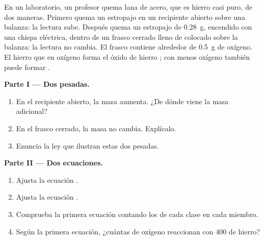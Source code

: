\begin{problem}
\label{pb:g8:balanced-equations:1}
En un laboratorio, un profesor quema lana de acero, que es hierro casi
puro, de dos maneras. Primero quema un estropajo en un recipiente
abierto sobre una balanza: la lectura sube. Después quema un estropajo
de \qty{0.28}{g}, encendido con una chispa eléctrica, dentro de un
frasco cerrado lleno de  colocado sobre la balanza: la lectura no
cambia. El frasco contiene alrededor de \qty{0.5}{g} de oxígeno. El
hierro que  en oxígeno forma el óxido de hierro ; con
menos oxígeno también puede formar .

\medskip
\noindent\textbf{Parte I --- Dos pesadas.}
\begin{enumerate}
  \item En el recipiente abierto, la masa aumenta. ¿De dónde viene la
        masa adicional?
  \item En el frasco cerrado, la masa no cambia. Explícalo.
  \item Enuncia la ley que ilustran estas dos pesadas.
\end{enumerate}

\medskip
\noindent\textbf{Parte II --- Dos ecuaciones.}
\begin{enumerate}[resume]
  \item Ajusta la ecuación . %
  \item Ajusta la ecuación . %
  \item Comprueba la primera ecuación contando los  de cada clase
        en cada miembro.
  \item Según la primera ecuación, ¿cuántas  de oxígeno
        reaccionan con 400  de hierro?
\end{enumerate}


\end{problem}
